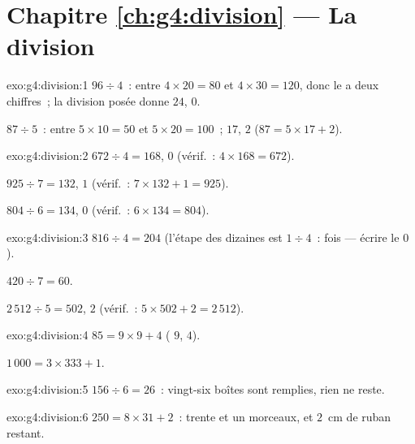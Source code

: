\section*{Chapitre \ref{ch:g4:division} --- La division}

\begin{solution}{exo:g4:division:1}
$96 \div 4$~: entre $4 \times 20 = 80$ et $4 \times 30 = 120$, donc
le  a deux chiffres~; la division posée donne $24$, 
$0$.

$87 \div 5$~: entre $5 \times 10 = 50$ et $5 \times 20 = 100$~;
 $17$,  $2$ ($87 = 5 \times 17 + 2$).
\end{solution}

\begin{solution}{exo:g4:division:2}
$672 \div 4 = 168$,  $0$ (vérif.~: $4 \times 168 = 672$).

$925 \div 7 = 132$,  $1$ (vérif.~:
$7 \times 132 + 1 = 925$).

$804 \div 6 = 134$,  $0$ (vérif.~: $6 \times 134 = 804$).
\end{solution}

\begin{solution}{exo:g4:division:3}
$816 \div 4 = 204$ (l'étape des dizaines est $1 \div 4$~: 
fois --- écrire le $0$).

$420 \div 7 = 60$.

$2\,512 \div 5 = 502$,  $2$ (vérif.~:
$5 \times 502 + 2 = 2\,512$).
\end{solution}

\begin{solution}{exo:g4:division:4}
$85 = 9 \times 9 + 4$ ( $9$,  $4$).

$1\,000 = 3 \times 333 + 1$.
\end{solution}

\begin{solution}{exo:g4:division:5}
$156 \div 6 = 26$~: vingt-six boîtes sont remplies, rien ne reste.
\end{solution}

\begin{solution}{exo:g4:division:6}
$250 = 8 \times 31 + 2$~: trente et un morceaux, et $2$~cm de ruban
restant.
\end{solution}

